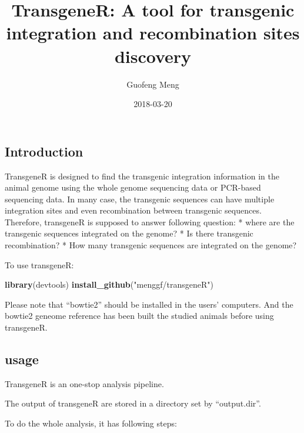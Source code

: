 \documentclass[]{article}
\title{TransgeneR: A tool for transgenic integration and recombination sites
discovery}
\author{Guofeng Meng}
\date{2018-03-20}
\newenvironment{Shaded}{\begin{snugshade}}{\end{snugshade}}
\newcommand{\KeywordTok}[1]{\textcolor[rgb]{0.13,0.29,0.53}{\textbf{{#1}}}}
\newcommand{\StringTok}[1]{\textcolor[rgb]{0.31,0.60,0.02}{{#1}}}
\newcommand{\NormalTok}[1]{{#1}}
\begin{document}
\maketitle

{
\setcounter{tocdepth}{2}
\tableofcontents
}
\subsection{Introduction}\label{introduction}

TransgeneR is designed to find the transgenic integration information in
the animal genome using the whole genome sequencing data or PCR-based
sequencing data. In many case, the transgenic sequences can have
multiple integration sites and even recombination between transgenic
sequences. Therefore, transgeneR is supposed to answer following
question: * where are the transgenic sequences integrated on the genome?
* Is there transgenic recombination? * How many transgenic sequences are
integrated on the genome?

To use transgeneR:

\begin{Shaded}
\begin{Highlighting}[]
\KeywordTok{library}\NormalTok{(devtools)}
\KeywordTok{install_github}\NormalTok{(}\StringTok{"menggf/transgeneR"}\NormalTok{)}
\end{Highlighting}
\end{Shaded}

Please note that ``bowtie2'' should be installed in the users'
computers. And the bowtie2 geneome reference has been built the studied
animals before using transgeneR.

\subsection{usage}\label{usage}

TransgeneR is an one-stop analysis pipeline.

The output of transgeneR are stored in a directory set by
``output.dir''.

To do the whole analysis, it has following steps:
\end{document}
